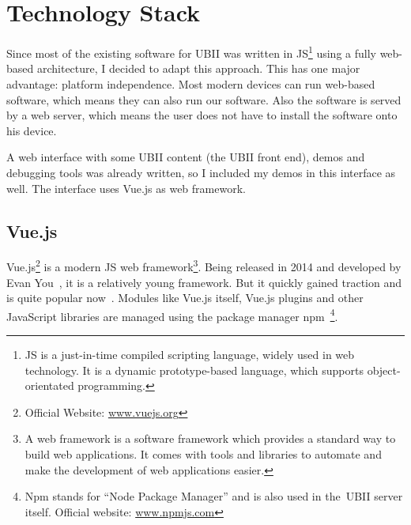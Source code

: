 \section{Technology Stack}\label{section:technology-stack}

Since most of the existing software for \ac{UBII} was written in \acf{JS}\footnote{\ac{JS} is a just-in-time compiled scripting language, widely used in web technology. It is a dynamic prototype-based language, which supports object-orientated programming.} using a fully web-based architecture, I decided to adapt this approach. This has one major advantage: platform independence. Most modern devices can run web-based software, which means they can also run our software. Also the software is served by a web server, which means the user does not have to install the software onto his device.

A web interface with some \ac{UBII} content (the \ac{UBII} front end), demos and debugging tools was already written, so I included my demos in this interface as well. The interface uses Vue.js as web framework.

\subsection{Vue.js}\label{subsection:vuejs}
Vue.js\footnote{Official Website: \href{https://vuejs.org/}{www.vuejs.org}} is a modern \ac{JS} web framework\footnote{A web framework is a software framework which provides a standard way to build web applications. It comes with tools and libraries to automate and make the development of web applications easier.}. Being released in 2014 and developed by Evan You~\cite[17]{Koetsier.2016}, it is a relatively young framework. But it quickly gained traction and is quite popular now~\cite[12\psq]{Koetsier.2016}.
Modules like Vue.js itself, Vue.js plugins and other JavaScript libraries are managed using the package manager npm~\footnote{Npm stands for \enquote{Node Package Manager} and is also used in the~\ac{UBII} server itself. Official website: \href{https://www.npmjs.com/}{www.npmjs.com}}.

